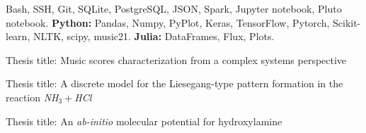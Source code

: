 \documentclass[10pt,a4paper,ragged2e,withhyper]{altacv}
\begin{document}
\begin{paracol}{2}
\divider\smallskip


Bash, SSH, Git, SQLite, PostgreSQL, JSON, Spark, Jupyter notebook, Pluto notebook. {\bf Python:} Pandas, Numpy, PyPlot, Keras, TensorFlow, Pytorch, Scikit-learn, NLTK, scipy, music21. {\bf Julia:} DataFrames, Flux, Plots. 


\divider

\divider


\medskip


Thesis title: Music scores characterization from a complex systems perspective

\divider

Thesis title: A discrete model for the Liesegang-type pattern formation in the reaction {\em NH$_3 +$HCl}
\divider

Thesis title: An {\em ab-initio} molecular potential for hydroxylamine

\divider

\medskip
{}


\divider



\end{paracol}
\end{document}
